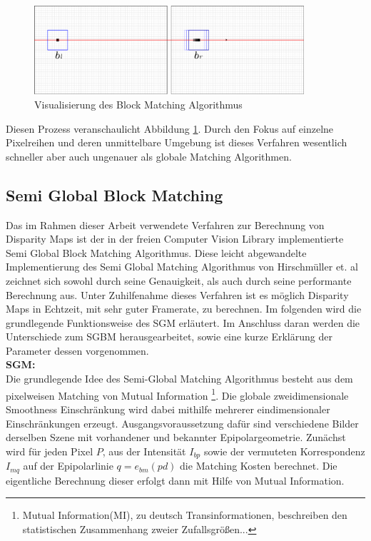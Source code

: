 \begin{figure}
	\begin{center}
		\includegraphics[width=10cm]{img/block_matching.pdf}
	\end{center}
	\caption{Visualisierung des Block Matching Algorithmus}
	\label{fig:block_matching}
\end{figure}

\noindent
Diesen Prozess veranschaulicht Abbildung \ref{fig:block_matching}. Durch den Fokus auf einzelne Pixelreihen und deren unmittelbare Umgebung ist dieses Verfahren wesentlich schneller aber auch ungenauer als globale Matching Algorithmen. 


\subsection{Semi Global Block Matching}
\label{subsec:stereo_matching_sgbm}
Das im Rahmen dieser Arbeit verwendete Verfahren zur Berechnung von Disparity Maps ist der in der freien Computer Vision Library implementierte Semi Global Block Matching Algorithmus. Diese leicht abgewandelte Implementierung des Semi Global Matching Algorithmus von Hirschmüller et. al \cite{hirschmuller2005sgm} zeichnet sich sowohl durch seine Genauigkeit, als auch durch seine performante Berechnung aus. Unter Zuhilfenahme dieses Verfahren ist es möglich Disparity Maps in Echtzeit, mit sehr guter Framerate, zu berechnen. Im folgenden wird die grundlegende Funktionsweise des SGM erläutert. Im Anschluss daran werden die Unterschiede zum SGBM herausgearbeitet, sowie eine kurze Erklärung der Parameter dessen vorgenommen.\\


\noindent
\textbf{SGM:} \\
Die grundlegende Idee des Semi-Global Matching Algorithmus besteht aus dem pixelweisen Matching von Mutual Information \footnote{Mutual Information(MI), zu deutsch Transinformationen, beschreiben den statistischen Zusammenhang zweier Zufallsgrößen...}. Die globale zweidimensionale Smoothness Einschränkung wird dabei mithilfe mehrerer eindimensionaler Einschränkungen erzeugt. Ausgangsvoraussetzung dafür sind verschiedene Bilder derselben Szene mit vorhandener und bekannter Epipolargeometrie. 
Zunächst wird für jeden Pixel $P$, aus der Intensität $I_{bp}$ sowie der vermuteten Korrespondenz $I_{mq}$ auf der Epipolarlinie $q=e_{bm}(pd)$ die Matching Kosten berechnet. Die eigentliche Berechnung dieser erfolgt dann mit Hilfe von Mutual Information.

